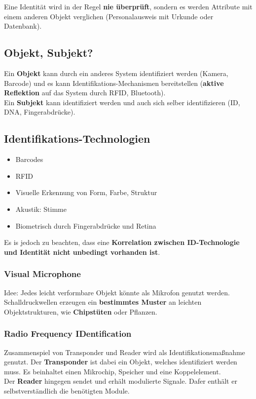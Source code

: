 \documentclass[a4paper]{article}
\begin{document}
Eine Identität wird in der Regel \textbf{nie überprüft}, sondern es werden Attribute mit einem anderen Objekt verglichen (Personalausweis mit Urkunde oder Datenbank).
\subsection{Objekt, Subjekt?}
Ein \textbf{Objekt} kann durch ein anderes System identifiziert werden (Kamera, Barcode) und es kann Identifikations-Mechanismen bereitstellen (\textbf{aktive Reflektion} auf das System durch RFID, Bluetooth).\\
Ein \textbf{Subjekt} kann identifiziert werden und auch sich selber identifizieren (ID, DNA, Fingerabdrücke).

\subsection{Identifikations-Technologien}
\begin{itemize}
	\item Barcodes
	\item RFID
	\item Visuelle Erkennung von Form, Farbe, Struktur
	\item Akustik: Stimme
	\item Biometrisch durch Fingerabdrücke und Retina
\end{itemize}
Es is jedoch zu beachten, dass eine \textbf{Korrelation zwischen ID-Technologie und Identität nicht unbedingt vorhanden ist}.
\subsubsection{Visual Microphone}
Idee: Jedes leicht verformbare Objekt könnte als Mikrofon genutzt werden. Schalldruckwellen erzeugen ein \textbf{bestimmtes Muster} an leichten Objektstrukturen, wie \textbf{Chipstüten} oder Pflanzen.
\subsubsection{Radio Frequency IDentification}
Zusammenspiel von Transponder und Reader wird als Identifikationsmaßnahme genutzt.
Der \textbf{Transponder} ist dabei ein Objekt, welches identifiziert werden muss. Es beinhaltet einen Mikrochip, Speicher und eine Koppelelement.\\
Der \textbf{Reader} hingegen sendet und erhält modulierte Signale. Dafer enthält er selbstverständlich die benötigten Module.\\
\end{document}

